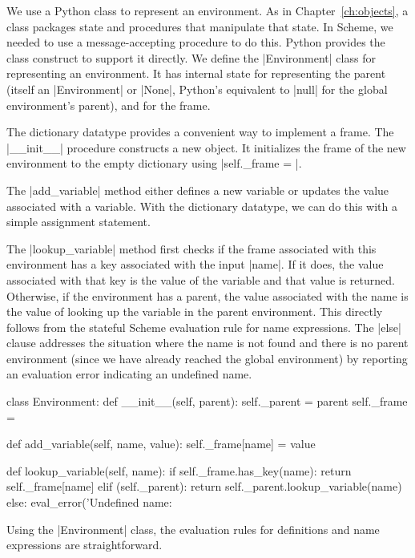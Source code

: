 We use a Python class to represent an environment.  As in Chapter~\ref{ch:objects}, a class packages state and procedures that manipulate that state.  In Scheme, we needed to use a message-accepting procedure to do this.  Python provides the class construct to support it directly.  We define the \pycode|Environment| class for representing an environment.  It has internal state for representing the parent (itself an \pycode|Environment| or \pycode|None|, Python's equivalent to \scheme|null| for the global environment's parent), and for the frame.

The dictionary datatype provides a convenient way to implement a frame.  The \pycode|__init__| procedure constructs a new object.  It initializes the frame of the new environment to the empty dictionary using \pycode|self._frame = {}|.  

The \pycode|add_variable| method either defines a new variable or updates the value associated with a variable.  With the dictionary datatype, we can do this with a simple assignment statement.  

The \pycode|lookup_variable| method first checks if the frame associated with this environment has a key associated with the input \pycode|name|.  If it does, the value associated with that key is the value of the variable and that value is returned.  Otherwise, if the environment has a parent, the value associated with the name is the value of looking up the variable in the parent environment.  This directly follows from the stateful Scheme evaluation rule for name expressions.  The \pycode|else| clause addresses the situation where the name is not found and there is no parent environment (since we have already reached the global environment) by reporting an evaluation error indicating an undefined name.

\begin{pythoncode}
class Environment:
    def __init__(self, parent):
        self._parent = parent
        self._frame = {}

    def add_variable(self, name, value):
        self._frame[name] = value

    def lookup_variable(self, name):
        if self._frame.has_key(name): return self._frame[name]
        elif (self._parent): return self._parent.lookup_variable(name)
        else: eval_error('Undefined name: %
\end{pythoncode}

Using the \pycode|Environment| class, the evaluation rules for definitions and name expressions are straightforward.

